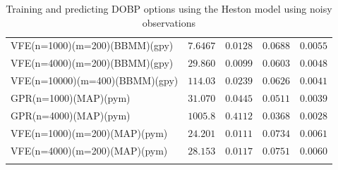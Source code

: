 \documentclass[12pt,a4paper,oneside]{book}
\begin{document}
\begin{table}
\begin{tabular}[t]{lcccc}
VFE(n=1000)(m=200)(BBMM)(gpy)   & $7.6467$  & $0.0128$  & $0.0688$  & $0.0055$    \\\addlinespace
VFE(n=4000)(m=200)(BBMM)(gpy)   & $29.860$  & $0.0099$  & $0.0603$  & $0.0048$     \\\addlinespace
VFE(n=10000)(m=400)(BBMM)(gpy)   & $114.03$  & $0.0239$   & $0.0626$  &     $0.0041$ \\\addlinespace
GPR(n=1000)(MAP)(pym)   & $31.070$  & $0.0445$  & $0.0511$  & $0.0039$     \\\addlinespace
GPR(n=4000)(MAP)(pym)   & $1005.8$   & $0.4112$  & $0.0368$   & $0.0028$    \\\addlinespace
VFE(n=1000)(m=200)(MAP)(pym)   & $24.201$  & $0.0111$  & $0.0734$  & $0.0061$    \\\addlinespace
VFE(n=4000)(m=200)(MAP)(pym)   & $28.153$  & $0.0117$  & $0.0751$  & $0.0060$   \\\addlinespace
\\\bottomrule
\end{tabular}
\caption{Training and predicting DOBP options using the Heston model using noisy observations}\label{dobp_outcomes}
\end{table}

\iffalse
\end{document}
